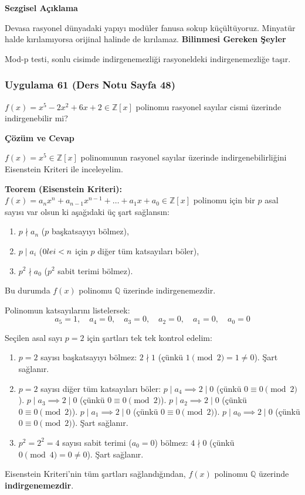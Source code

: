 \documentclass[11pt, a4paper]{article}
\newenvironment{cozum}{
    \vspace{0.5cm}
    \noindent\textcolor{green!60!black}{\faCheckCircle\enspace \textbf{\Large Çözüm ve Cevap}}\par\vspace{0.2cm}
}{}
\newenvironment{sezgisel}{
    \vspace{0.5cm}
    \noindent\textcolor{orange!80!black}{\faLightbulb\enspace \textbf{\Large Sezgisel Açıklama}}\par\vspace{0.2cm}
    \itshape
}{}
\newenvironment{bilgi}{
    \vspace{0.5cm}
    \noindent\textcolor{red!70!black}{\faExclamationTriangle\enspace \textbf{\Large Bilinmesi Gereken Şeyler}}\par\vspace{0.2cm}
}{}
\begin{document}
\begin{sezgisel}
Devasa rasyonel dünyadaki yapıyı modüler fanusa sokup küçültüyoruz. Minyatür halde kırılamıyorsa orijinal halinde de kırılamaz.
\end{sezgisel}
\begin{bilgi}
Mod-p testi, sonlu cisimde indirgenemezliği rasyoneldeki indirgenemezliğe taşır.
\end{bilgi}

\newpage
\subsubsection{Uygulama 61 (Ders Notu Sayfa 48)}
\begin{sorubox}
$f(x) = x^5 - 2x^2 + 6x + 2 \in \mathbb{Z}[x]$ polinomu rasyonel sayılar cismi üzerinde indirgenebilir mi?
\end{sorubox}
\begin{cozum}
$f(x) = x^{5} \in \mathbb{Z}[x]$ polinomunun rasyonel sayılar üzerinde indirgenebilirliğini Eisenstein Kriteri ile inceleyelim.

\textbf{Teorem (Eisenstein Kriteri):} $f(x) = a_n x^n + a_{n-1} x^{n-1} + \dots + a_1 x + a_0 \in \mathbb{Z}[x]$ polinomu için bir $p$ asal sayısı var olsun ki aşağıdaki üç şart sağlansın:
\begin{enumerate}
    \item $p \nmid a_n$ ($p$ başkatsayıyı bölmez),
    \item $p \mid a_i$ ($0 \\le i < n$ için $p$ diğer tüm katsayıları böler),
    \item $p^2 \nmid a_0$ ($p^2$ sabit terimi bölmez).
\end{enumerate}
Bu durumda $f(x)$ polinomu $\mathbb{Q}$ üzerinde indirgenemezdir.

Polinomun katsayılarını listelersek:
\[ a_{5} = 1, \quad a_{4} = 0, \quad a_{3} = 0, \quad a_{2} = 0, \quad a_{1} = 0, \quad a_{0} = 0 \]

Seçilen asal sayı $p = 2$ için şartları tek tek kontrol edelim:
\begin{enumerate}
    \item $p = 2$ sayısı başkatsayıyı bölmez: $2 \nmid 1$ (çünkü $1 \pmod{2} = 1 \neq 0$). Şart sağlanır.
    \item $p = 2$ sayısı diğer tüm katsayıları böler:
    $p \mid a_{4} \implies 2 \mid 0$ (çünkü $0 \equiv 0 \pmod{2}$).
    $p \mid a_{3} \implies 2 \mid 0$ (çünkü $0 \equiv 0 \pmod{2}$).
    $p \mid a_{2} \implies 2 \mid 0$ (çünkü $0 \equiv 0 \pmod{2}$).
    $p \mid a_{1} \implies 2 \mid 0$ (çünkü $0 \equiv 0 \pmod{2}$).
    $p \mid a_{0} \implies 2 \mid 0$ (çünkü $0 \equiv 0 \pmod{2}$).
    Şart sağlanır.
    \item $p^2 = 2^2 = 4$ sayısı sabit terimi ($a_0 = 0$) bölmez: $4 \nmid 0$ (çünkü $0 \pmod{4} = 0 \neq 0$). Şart sağlanır.
\end{enumerate}

Eisenstein Kriteri'nin tüm şartları sağlandığından, $f(x)$ polinomu $\mathbb{Q}$ üzerinde \textbf{indirgenemezdir}.
\end{cozum}
\end{document}
